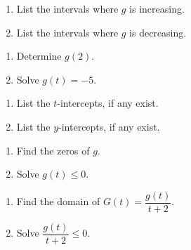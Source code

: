 \documentclass{ximera}
\begin{document}
\begin{multicols}{2}
\begin{enumerate}
\setcounter{enumi}{\value{HW}}

\item  List the intervals where $g$ is increasing.
\item  List the intervals where $g$ is decreasing.

\setcounter{HW}{\value{enumi}}
\end{enumerate}
\end{multicols}


\begin{multicols}{2}
\begin{enumerate}
\setcounter{enumi}{\value{HW}}

\item  Determine $g(2)$.
\item  Solve $g(t) = -5$.

\setcounter{HW}{\value{enumi}}
\end{enumerate}
\end{multicols}

\begin{multicols}{2}
\begin{enumerate}
\setcounter{enumi}{\value{HW}}

\item  List the $t$-intercepts, if any exist.
\item  List the $y$-intercepts, if any exist.

\setcounter{HW}{\value{enumi}}
\end{enumerate}
\end{multicols}

\begin{multicols}{2}
\begin{enumerate}
\setcounter{enumi}{\value{HW}}

\item  Find the zeros of $g$.
\item  Solve $g(t) \leq 0$.

\setcounter{HW}{\value{enumi}}
\end{enumerate}
\end{multicols}

\begin{multicols}{2}
\begin{enumerate}
\setcounter{enumi}{\value{HW}}

\item  Find the domain of $G(t) = \dfrac{g(t)}{t+2}$.
\item  Solve $\dfrac{g(t)}{t+2} \leq 0$.

\setcounter{HW}{\value{enumi}}
\end{enumerate}
\end{multicols}
\end{document}
